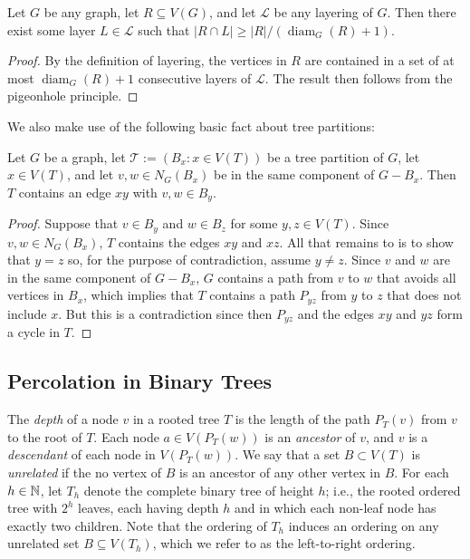 \documentclass{patmorin}
\newcommand{\defin}[1]{\emph{\color{brightmaroon}#1}}
\DeclareMathOperator{\diam}{diam}
\renewcommand{\ge}{\geqslant}
\begin{document}
\begin{obs}\label{diameter_spread}
  Let $G$ be any graph, let $R\subseteq V(G)$, and let $\mathcal{L}$ be any layering of $G$.  Then there exist some layer $L\in\mathcal{L}$ such that $|R\cap L|\ge |R|/(\diam_G(R)+1)$.
\end{obs}

\begin{proof}
  By the definition of layering, the vertices in $R$ are contained in a set of at most $\diam_G(R)+1$ consecutive layers of $\mathcal{L}$. The result then follows from the pigeonhole principle.
\end{proof}


We also make use of the following basic fact about tree partitions:

\begin{obs}\label{tree_thingy}
  Let $G$ be a graph, let $\mathcal{T}:=(B_x:x\in V(T))$ be a tree partition of $G$, let $x\in V(T)$, and let $v,w\in N_G(B_x)$ be in the same component of $G-B_x$.  Then $T$ contains an edge $xy$ with $v,w\in B_y$.
\end{obs}

\begin{proof}
  Suppose that $v\in B_y$ and $w\in B_z$ for some $y,z\in V(T)$.  Since $v,w\in N_G(B_x)$, $T$ contains the edges $xy$ and $xz$.  All that remains to is to show that $y=z$ so, for the purpose of contradiction, assume $y\neq z$.  Since $v$ and $w$ are in the same component of $G-B_x$, $G$ contains a path from $v$ to $w$ that avoids all vertices in $B_x$, which implies that $T$ contains a path $P_{yz}$ from $y$ to $z$ that does not include $x$.  But this is a contradiction since then $P_{yz}$ and the edges $xy$ and $yz$ form a cycle in $T$.
\end{proof}

\subsection{Percolation in Binary Trees}


The \defin{depth} of a node $v$ in a rooted tree $T$ is the length of the path $P_T(v)$ from $v$ to the root of $T$.  Each node $a\in V(P_T(w))$ is an \defin{ancestor} of $v$, and $v$ is a \defin{descendant} of each node in $V(P_T(w))$.  We say that a set $B\subset V(T)$ is \defin{unrelated} if the no vertex of $B$ is an ancestor of any other vertex in $B$.  For each $h\in\mathbb{N}$, let $T_h$ denote the complete binary tree of height $h$; i.e., the rooted ordered tree with $2^h$ leaves, each having depth $h$ and in which each non-leaf node has exactly two children.  Note that the ordering of $T_h$ induces an ordering on any unrelated set $B\subseteq V(T_h)$, which we refer to as the left-to-right ordering.
\end{document}
